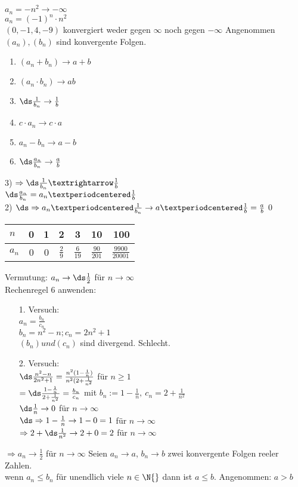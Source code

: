 $a_n = -n^2 \to -∞$\\
$a_n = (-1)^n · n^2$\\
$(0, -1, 4, -9)$ konvergiert weder gegen $∞$ noch gegen $ - ∞$
%
Angenommen $(a_n), (b_n)$ sind konvergente Folgen.\\
\begin{enumerate}
\item{$(a_n + b_n) \to a + b$}
\item{$(a_n · b_n) \to ab$}
\item{$\ds\frac{1}{b_n} \to \frac{1}{b}$}
\item{$c · a_n \to c · a$}
\item{$a_n - b_n \to a - b$}
\item{$\ds\frac{a_n}{b_n} \to \frac{a}{b}$}
\end{enumerate}
%
3) $\Rightarrow\ds\frac{1}{b_n}→\frac{1}{b}$\\
$\ds\frac{a_n}{b_n} = a_n ·\frac{1}{b}$\\
2) $\ds\Rightarrow a_n · \frac{1}{b_n} \to a ·\frac{1}{b} = \frac{a}{b}$\qed
%
\bsp
\begin{tabular}{l|c|c|c|c|c|r}
$n$   & 0 & 1 & 2 & 3 & 10 & 100\\\hline
$a_n$ & 0 & 0 & $\frac{2}{9}$ & $\frac{6}{19}$ & $\frac{90}{201}$ & $\frac{9900}{20001}$ \\
\end{tabular}
\vspace{5mm}
Vermutung: $a_n \to \ds\frac{1}{2}$ für $n \to ∞$\\
Rechenregel 6 anwenden:\\
\begin{itemize}
\item[1.]{Versuch:\\
$a_n = \frac{b_n}{c_n}$\\[4pt]
$b_n = n^2 -n; c_n = 2n^2 + 1$\\
$(b_n) und (c_n)$ sind divergend. Schlecht.}
\item[2.]{Versuch:\\
$\ds\frac{n^2 - n}{2n^2 + 1} = \frac{n^2(1 - \frac{1}{n})}{n^2(2 + \frac{1}{n^2}}$ für $n \geq 1$\\[4pt]
$= \ds\frac{1-\frac{1}{n}}{2 +\frac{1}{n^2}}=\frac{b_n}{c_n}$ mit $b_n:=1-\frac{1}{n},\ c_n = 2 + \frac{1}{n^2}$\\[4pt]
$\ds\frac{1}{n} \to 0$ für $n \to ∞ $\\[4pt]
$\ds\Rightarrow 1 - \frac{1}{n} \to 1 - 0 = 1$ für $n \to ∞$\\[4pt]
$\Rightarrow 2 + \ds\frac{1}{n^2} \to 2 + 0 = 2$ für $n \to ∞$}
\end{itemize}
%
$\Rightarrow a_n \to \frac{1}{2}$ für $n \to ∞$
%
Seien $a_n \to a$, $b_n \to b$ zwei konvergente Folgen reeler Zahlen.\\
wenn $a_n \leq b_n$ für unendlich viele $n \in \N{}$ dann ist $a \leq b$.
\bew
Angenommen: $a > b$\\

